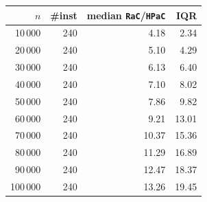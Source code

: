 \begin{tabular}{@{}rrrr@{}}
\toprule
$n$ & \#inst & median \texttt{RaC}/\texttt{HPaC} & IQR \\
\midrule
10\,000 & 240 & 4.18 & 2.34 \\
20\,000 & 240 & 5.10 & 4.29 \\
30\,000 & 240 & 6.13 & 6.40 \\
40\,000 & 240 & 7.10 & 8.02 \\
50\,000 & 240 & 7.86 & 9.82 \\
60\,000 & 240 & 9.21 & 13.01 \\
70\,000 & 240 & 10.37 & 15.36 \\
80\,000 & 240 & 11.29 & 16.89 \\
90\,000 & 240 & 12.47 & 18.37 \\
100\,000 & 240 & 13.26 & 19.45 \\
\bottomrule
\end{tabular}
